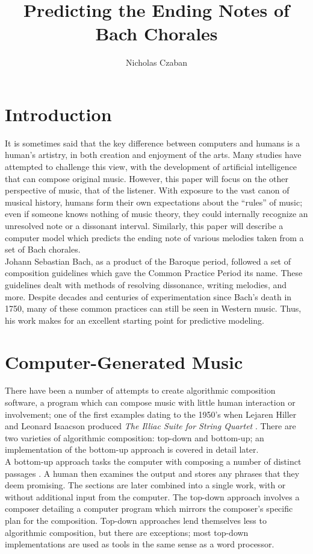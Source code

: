 \documentclass[12pt]{article}
\begin{document}
\title{Predicting the Ending Notes of Bach Chorales}
\author{Nicholas Czaban}
\maketitle

\section{Introduction}
It is sometimes said that the key difference between computers and humans is a human's artistry, in both creation and enjoyment of the arts. Many studies have attempted to challenge this view, with the development of artificial intelligence that can compose original music. However, this paper will focus on the other perspective of music, that of the listener. With exposure to the vast canon of musical history, humans form their own expectations about the ``rules'' of music; even if someone knows nothing of music theory, they could internally recognize an unresolved note or a dissonant interval. Similarly, this paper will describe a computer model which predicts the ending note of various melodies taken from a set of Bach chorales.\\

Johann Sebastian Bach, as a product of the Baroque period, followed a set of composition guidelines which gave the Common Practice Period its name. These guidelines dealt with methods of resolving dissonance, writing melodies, and more. Despite decades and centuries of experimentation since Bach's death in 1750, many of these common practices can still be seen in Western music. Thus, his work makes for an excellent starting point for predictive modeling. 

\section{Computer-Generated Music}
There have been a number of attempts to create algorithmic composition software, a program which can compose music with little human interaction or involvement; one of the first examples dating to the 1950's when Lejaren Hiller and Leonard Isaacson produced {\it The Illiac Suite for String Quartet} \cite{computers}. There are two varieties of algorithmic composition: top-down and bottom-up; an implementation of the bottom-up approach is covered in detail later.\\

A bottom-up approach tasks the computer with composing a number of distinct passages \cite{computers}. A human then examines the output and stores any phrases that they deem promising. The sections are later combined into a single work, with or without additional input from the computer. The top-down approach involves a composer detailing a computer program which mirrors the composer's specific plan for the composition. Top-down approaches lend themselves less to algorithmic composition, but there are exceptions; most top-down implementations are used as tools in the same sense as a word processor.
\end{document}
